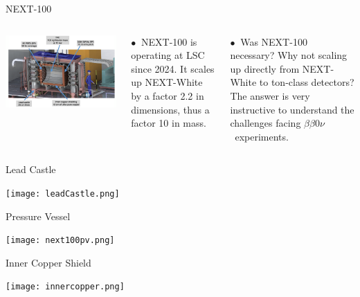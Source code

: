 \documentclass [aspectratio=169]{beamer}
\newcommand{\bbonu}{\ensuremath{\beta\beta0\nu}}
\begin{document}
\begin{frame}{NEXT-100}

\begin{columns}
\includegraphics[scale=0.24]{next100withcastle.png}


$\bullet~$ NEXT-100 is operating at LSC since 2024. It scales up NEXT-White by a factor 2.2 in dimensions, thus a factor 10 in mass.  

$\bullet~$ Was NEXT-100 necessary? Why not scaling up directly from NEXT-White to ton-class detectors? The answer is very instructive to understand the challenges facing \bbonu\ experiments.

\end{columns}
\end{frame}

%
%

\begin{frame}{Lead Castle}

\texttt{[image: leadCastle.png]}

\end{frame}


\begin{frame}{Pressure Vessel}

\texttt{[image: next100pv.png]}

\end{frame}

\begin{frame}{Inner Copper Shield}

\texttt{[image: innercopper.png]}

\end{frame}
\end{document}
